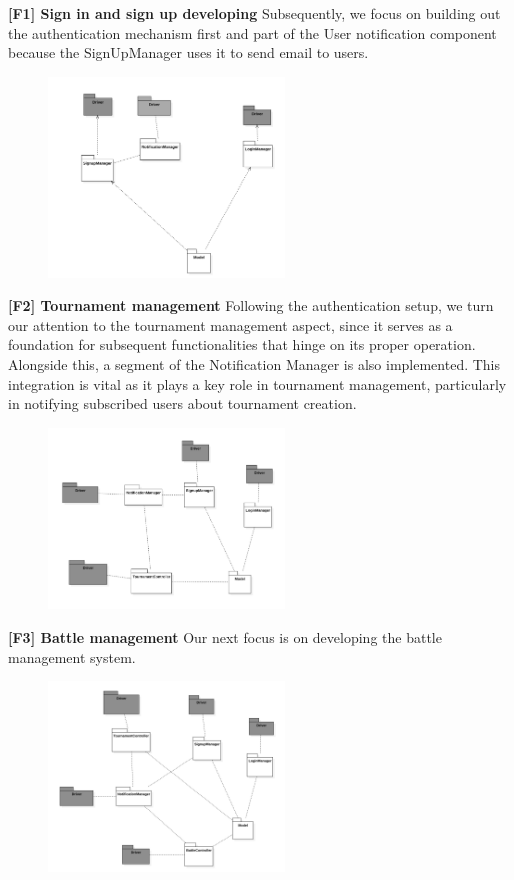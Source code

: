 \textbf{[F1] Sign in and sign up developing}
Subsequently, we focus on building out the authentication mechanism first and part of the User notification component  because the SignUpManager  uses it to send email to users.

\begin{figure}[H]
    \centering
    \includegraphics[width=0.56\textwidth]{Test/Login.png}
    \label{fig:enter-label}
\end{figure}
\textbf{[F2] Tournament management}
Following the authentication setup, we turn our attention to the tournament management aspect, since it serves as a foundation for subsequent functionalities that hinge on its proper operation. Alongside this, a segment of the Notification Manager is also implemented. This integration is vital as it plays a key role in tournament management, particularly in notifying subscribed users about tournament creation.
\begin{figure}[H]
    \centering
    \includegraphics[width=0.56\textwidth]{Test/Tournament.png}
    \label{fig:enter-label}
\end{figure}
\textbf{[F3] Battle management}
Our next focus is on developing the battle management system. 
\begin{figure}[H]
    \centering
    \includegraphics[width=0.56\textwidth]{Test/Battle.png}
    \label{fig:enter-label}
\end{figure}
